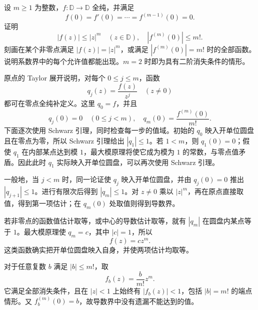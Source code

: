 \begin{exercise}\label{b3:ex:02-7}
设 \(m\ge1\) 为整数，\(f:\mathbb D\rightarrow\mathbb D\) 全纯，并满足
\[
  f(0)=f'(0)=\cdots=f^{(m-1)}(0)=0.
\]
证明
\[
  |f(z)|\le|z|^m\quad(z\in\mathbb D),
  \quad |f^{(m)}(0)|\le m!.
\]
刻画在某个非零点满足 \(|f(z)|=|z|^m\)，或满足 \(|f^{(m)}(0)|=m!\) 时的全部函数。说明系数界中的每个允许值都能出现。\(m=2\) 时即为具有二阶消失条件的情形。
\end{exercise}
\begin{solution}
原点的 Taylor 展开说明，对每个 \(0\le j\le m\)，函数
\[
  q_j(z)=\frac{f(z)}{z^j}\quad(z\ne0)
\]
都可在零点全纯补定义。这里 \(q_0=f\)，并且
\[
  q_j(0)=0\quad(0\le j<m),
  \quad q_m(0)=\frac{f^{(m)}(0)}{m!}.
\]
下面逐次使用 Schwarz 引理，同时检查每一步的值域。初始的 \(q_0\) 映入开单位圆盘且在零点为零，所以 Schwarz 引理给出 \(|q_1|\le1\)。若 \(1<m\)，则 \(q_1(0)=0\)；假使 \(q_1\) 在内部某点达到模 \(1\)，最大模原理将使它成为模为 \(1\) 的常数，与零点值矛盾。因此此时 \(q_1\) 实际映入开单位圆盘，可以再次使用 Schwarz 引理。

一般地，当 \(j<m\) 时，同一论证使 \(q_j\) 映入开单位圆盘，并由 \(q_j(0)=0\) 推出 \(|q_{j+1}|\le1\)。进行有限次后得到 \(|q_m|\le1\)。对 \(z\ne0\) 乘以 \(|z|^m\)，再在原点直接取值，得到第一项估计；在 \(q_m(0)\) 处取值则得到导数界。

若非零点的函数值估计取等，或中心的导数估计取等，就有 \(|q_m|\) 在圆盘内某点等于 \(1\)。最大模原理使 \(q_m=c\)，其中 \(|c|=1\)，所以
\[
  f(z)=c z^m.
\]
这类函数确实把开单位圆盘映入自身，并使两项估计均取等。

对于任意复数 \(b\) 满足 \(|b|\le m!\)，取
\[
  f_b(z)=\frac b{m!}z^m.
\]
它满足全部消失条件，且在 \(|z|<1\) 上始终有 \(|f_b(z)|<1\)，包括 \(|b|=m!\) 的端点情形。又 \(f_b^{(m)}(0)=b\)，故导数界中没有遗漏不能达到的值。
\end{solution}


